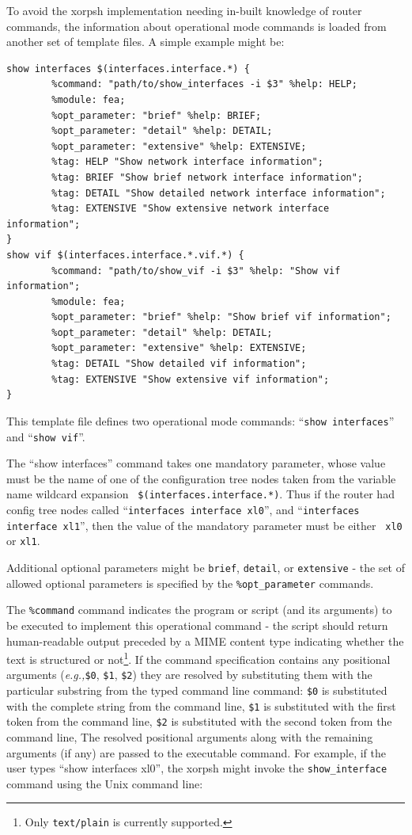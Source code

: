 \documentclass[11pt]{article}
\newcommand{\eg}{\emph{e.g.,}\xspace}
\begin{document}
To avoid the xorpsh implementation needing in-built knowledge of
router commands, the information about operational mode commands is
loaded from another set of template files.  A simple example might be:

\begin{verbatim}
show interfaces $(interfaces.interface.*) {
        %command: "path/to/show_interfaces -i $3" %help: HELP;
        %module: fea;
        %opt_parameter: "brief" %help: BRIEF;
        %opt_parameter: "detail" %help: DETAIL;
        %opt_parameter: "extensive" %help: EXTENSIVE;
        %tag: HELP "Show network interface information";
        %tag: BRIEF "Show brief network interface information";
        %tag: DETAIL "Show detailed network interface information";
        %tag: EXTENSIVE "Show extensive network interface information";
}
show vif $(interfaces.interface.*.vif.*) {
        %command: "path/to/show_vif -i $3" %help: "Show vif information";
        %module: fea;
        %opt_parameter: "brief" %help: "Show brief vif information";
        %opt_parameter: "detail" %help: DETAIL;
        %opt_parameter: "extensive" %help: EXTENSIVE;
        %tag: DETAIL "Show detailed vif information";
        %tag: EXTENSIVE "Show extensive vif information";
}
\end{verbatim}

This template file defines two operational mode commands:
``{\tt show interfaces}'' and ``{\tt show vif}''.

The ``show interfaces'' command takes one mandatory parameter, whose
value must be the name of one of the configuration tree nodes taken
from the variable name wildcard expansion {\tt
\$(interfaces.interface.*)}.  Thus if the router had config tree nodes
called ``{\tt interfaces interface xl0}'', and ``{\tt interfaces interface
xl1}'', then the value of the mandatory parameter must be either {\tt
xl0} or {\tt xl1}.

Additional optional parameters might be {\tt brief}, {\tt detail}, or
{\tt extensive} - the set of allowed optional parameters is specified
by the {\tt \%opt\_parameter} commands.

The {\tt \%command} command indicates the program or script (and its
arguments) to be
executed to implement this operational command - the script should return
human-readable output preceded by a MIME content type indicating
whether the text is structured or not\footnote{Only {\tt text/plain}
is currently supported.}.
If the command specification contains any positional arguments
(\eg {\tt \$0}, {\tt \$1}, {\tt \$2}) they are resolved by substituting
them with the particular substring from the typed command line command:
{\tt \$0} is substituted with the complete string from the command line,
{\tt \$1} is substituted with the first token from the command line,
{\tt \$2} is substituted with the second token from the command line,
The resolved positional arguments along with the remaining arguments
(if any) are passed to the executable command.
For example, if the user types ``show interfaces xl0'', the xorpsh might invoke
the {\tt show\_interface} command using the Unix command line:
\end{document}
